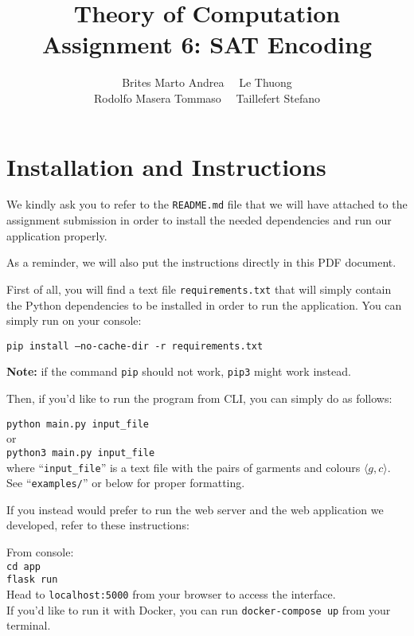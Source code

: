 \documentclass[12pt]{article}
\title{Theory of Computation \\ Assignment 6: SAT Encoding}
\author{Brites Marto Andrea \ \ Le Thuong \\ Rodolfo Masera Tommaso \ \ Taillefert Stefano}
\date{}
\begin{document}
\maketitle

\section{Installation and Instructions}

We kindly ask you to refer to the \texttt{README.md} file that we will have attached to the assignment submission in order to install the needed dependencies and run our application properly.

As a reminder, we will also put the instructions directly in this PDF document.

First of all, you will find a text file \texttt{requirements.txt} that will simply contain the Python dependencies to be installed in order to run the application. You can simply run on your console:\\

\begin{center}
	\texttt{pip install --no-cache-dir -r requirements.txt}\\
	\begin{small}
		\textbf{Note:} if the command \texttt{pip} should not work, \texttt{pip3} might work instead.
	\end{small}
\end{center}

Then, if you'd like to run the program from CLI, you can simply do as follows:

\begin{center}
	\texttt{python main.py input\_file}\\
	or \\
	\texttt{python3 main.py input\_file} \\
	where ``\texttt{input\_file}'' is a text file with the pairs of garments and colours $\langle g, c \rangle$. See ``\texttt{examples/}'' or below for proper formatting.
\end{center}

If you instead would prefer to run the web server and the web application we developed, refer to these instructions:

\begin{center}
	From console: \\
	\texttt{cd app}\\
	\texttt{flask run}\\
	Head to \texttt{localhost:5000} from your browser to access the interface.\\
	If you'd like to run it with Docker, you can run \texttt{docker-compose up} from your terminal.
\end{center}
\end{document}

